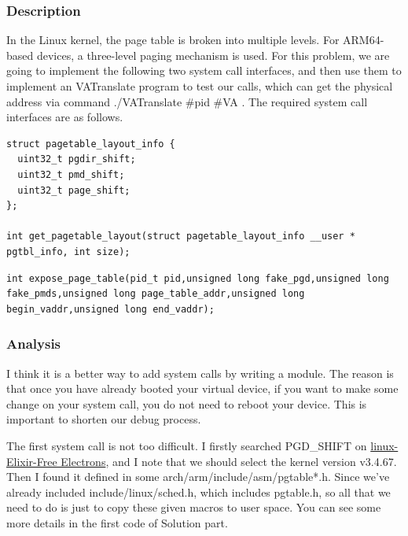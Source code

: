 \documentclass[12pt,a4paper,UTF8]{article}
\theoremstyle{definition}
\numberwithin{equation}{section}
\numberwithin{figure}{section}
\begin{document}
\subsubsection{Description}
In the Linux kernel, the page table is broken into multiple levels. For ARM64-based devices, a three-level paging mechanism is used. For this problem, we are going to implement the following two system call interfaces, and then use them to implement an VATranslate program to test our calls, which can get the physical address via command {\color{cyan}\bashfont./VATranslate \#pid \#VA} . The required system call interfaces are as follows. 

\begin{lstlisting}[style=cmod]
struct pagetable_layout_info {
  uint32_t pgdir_shift;
  uint32_t pmd_shift;
  uint32_t page_shift;
};

int get_pagetable_layout(struct pagetable_layout_info __user * pgtbl_info, int size);
\end{lstlisting}
\begin{lstlisting}[style=cmod]
int expose_page_table(pid_t pid,unsigned long fake_pgd,unsigned long fake_pmds,unsigned long page_table_addr,unsigned long begin_vaddr,unsigned long end_vaddr);
\end{lstlisting}
\subsubsection{Analysis}
I think it is a better way to add system calls by writing a module. The reason is that once you have already booted your virtual device, if you want to make some change on your system call, you do not need to reboot your device. This is important to shorten our debug process.

The first system call is not too difficult. I firstly searched PGD\_SHIFT on \href{http://elixir.free-electrons.com/linux/v3.4.67/ident/}{linux-Elixir-Free Electrons}, and I note that we should select the kernel version v3.4.67. Then I found it defined in some {\color{blue}arch/arm/include/asm/pgtable*.h}. Since we've already included {\color{blue}include/linux/sched.h}, which includes {\color{blue}pgtable.h}, so all that we need to do is just to copy these given macros to user space. You can see some more details in the first code of Solution part.
\end{document}
